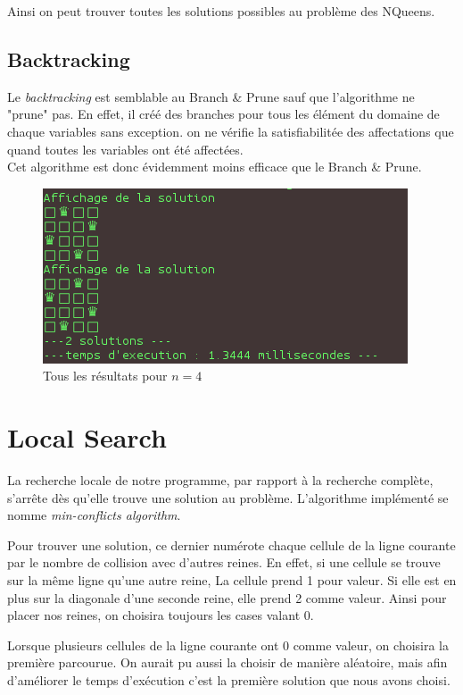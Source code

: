 \documentclass{article}
\begin{document}
Ainsi on peut trouver toutes les solutions possibles au problème des NQueens.

\subsection{Backtracking}
Le \emph{backtracking} est semblable au Branch \& Prune sauf que l'algorithme ne "prune" pas. En effet, il créé des branches pour tous les 
élément du domaine de chaque variables sans exception. on ne vérifie la satisfiabilitée des affectations que quand toutes les variables
ont été affectées.\\
Cet algorithme est donc évidemment moins efficace que le Branch \& Prune.

\begin{figure}[!h]
\caption{\label{complete4} Tous les résultats pour $n = 4$}
\begin{center}
\includegraphics[scale=0.5]{./picture/complete_4.png}
\end{center}
\end{figure}

\section{Local Search}

La recherche locale de notre programme, par rapport à la recherche complète, s'arrête dès qu'elle trouve une solution au problème. L'algorithme implémenté se nomme
\emph{min-conflicts algorithm}. 

Pour trouver une solution, ce dernier numérote chaque cellule de la ligne courante par le nombre de collision avec d'autres reines. En effet, si une cellule se trouve sur la même ligne qu'une autre reine, La cellule prend 1 pour valeur. Si elle est en plus sur la diagonale d'une seconde reine, elle prend 2 comme valeur.
Ainsi pour placer nos reines, on choisira toujours les cases valant 0.

Lorsque plusieurs cellules de la ligne courante ont 0 comme valeur, on choisira la première parcourue. On aurait pu aussi la choisir de manière aléatoire, mais afin d'améliorer le temps d'exécution c'est la première solution que nous avons choisi. 
\end{document}
